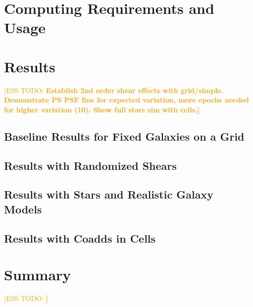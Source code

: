 \documentclass[iop, twocolappendix, appendixfloats, numberedappendix, apj]{hackemulateapj}
\newcommand{\esstodo}[1]{\textcolor{orange}{[ESS TODO: \bf #1]}}
\newcommand{\descwl}{\texttt{WeakLensingDeblending}}
\begin{document}
\section{Computing Requirements and Usage} \label{sec:timing}

\section{Results} \label{sec:results}

\esstodo{Establish 2nd order shear effects with grid/simple.  Demonstrate PS PSF fine for expected variation, more epochs needed for higher variation (10). Show full stars sim with cells.}

\subsection{Baseline Results for Fixed Galaxies on a Grid} \label{sec:results:secondorder}

\subsection{Results with Randomized Shears} \label{sec:results:randshear}

\subsection{Results with Stars and Realistic Galaxy Models} \label{sec:results:full}

\subsection{Results with Coadds in Cells} \label{sec:results:cells}


\section{Summary} \label{sec:summary}

\esstodo{}

% 

\end{document}
